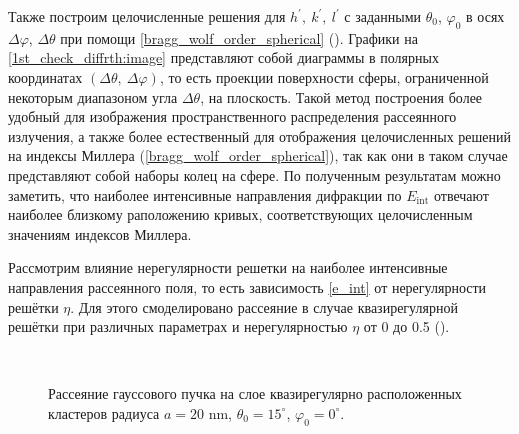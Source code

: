 Также построим целочисленные решения для $h^\prime,\:k^\prime,\:l^\prime$ с заданными $\theta_0$, $\varphi_0$ в осях $\Delta \varphi$, $\Delta \theta$ при помощи \autoref{bragg_wolf_order_spherical} (). Графики на \autoref{1st_check_diffrth:image} представляют собой диаграммы в полярных координатах $(\Delta \theta, \: \Delta \varphi)$, то есть проекции поверхности сферы, ограниченной некоторым диапазоном угла $\Delta \theta$, на плоскость. Такой метод построения более удобный для изображения пространственного распределения рассеянного излучения, а также более естественный для отображения целочисленных решений на индексы Миллера (\autoref{bragg_wolf_order_spherical}), так как они в таком случае представляют собой наборы колец на сфере. По полученным результатам можно заметить, что наиболее интенсивные направления дифракции по $E_{\textrm{int}}$ отвечают наиболее близкому раположению кривых, соответствующих целочисленным значениям индексов Миллера.

Рассмотрим влияние нерегулярности решетки на наиболее интенсивные направления рассеянного поля, то есть зависимость \autoref{e_int} от нерегулярности решётки $\eta$. Для этого смоделировано рассеяние в случае квазирегулярной решётки при различных параметрах и нерегулярностью $\eta$ от 0 до 0.5 ().


    \begin{figure}[H]

        \hfil
        \\
        \caption{Рассеяние гауссового пучка на слое квазирегулярно расположенных кластеров радиуса $a = 20$ nm, $\theta_0 = 15^{\circ}$, $\varphi_0 = 0^{\circ}$.}\label{nonreg_ka0.7:image}
    \end{figure}

